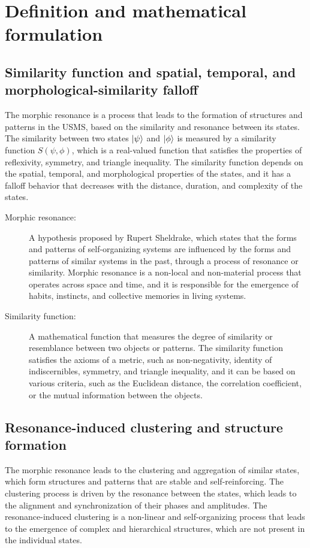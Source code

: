 
\section{Definition and mathematical formulation}
\subsection{Similarity function and spatial, temporal, and morphological-similarity falloff}
The morphic resonance is a process that leads to the formation of structures and patterns in the USMS, based on the similarity and resonance between its states. The similarity between two states $\ket{\psi}$ and $\ket{\phi}$ is measured by a similarity function $S(\psi,\phi)$, which is a real-valued function that satisfies the properties of reflexivity, symmetry, and triangle inequality. The similarity function depends on the spatial, temporal, and morphological properties of the states, and it has a falloff behavior that decreases with the distance, duration, and complexity of the states.

\begin{tcolorbox}[colback=blue!5!white,colframe=blue!75!black,title=New terms]
\begin{description}
\item[Morphic resonance:] A hypothesis proposed by Rupert Sheldrake, which states that the forms and patterns of self-organizing systems are influenced by the forms and patterns of similar systems in the past, through a process of resonance or similarity. Morphic resonance is a non-local and non-material process that operates across space and time, and it is responsible for the emergence of habits, instincts, and collective memories in living systems.
\item[Similarity function:] A mathematical function that measures the degree of similarity or resemblance between two objects or patterns. The similarity function satisfies the axioms of a metric, such as non-negativity, identity of indiscernibles, symmetry, and triangle inequality, and it can be based on various criteria, such as the Euclidean distance, the correlation coefficient, or the mutual information between the objects.
\end{description}
\end{tcolorbox}

\subsection{Resonance-induced clustering and structure formation}
The morphic resonance leads to the clustering and aggregation of similar states, which form structures and patterns that are stable and self-reinforcing. The clustering process is driven by the resonance between the states, which leads to the alignment and synchronization of their phases and amplitudes. The resonance-induced clustering is a non-linear and self-organizing process that leads to the emergence of complex and hierarchical structures, which are not present in the individual states.

